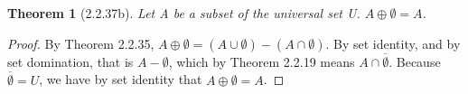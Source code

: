 \documentclass[a4paper, 12pt]{article}
\theoremstyle{plain}
\newtheorem*{theorem*}{Theorem}
\begin{document}
	
	\begin{theorem*}[2.2.37b]
		Let A be a subset of the universal set U. $A \oplus \emptyset = A$.
	\end{theorem*}
	
	\begin{proof}
		By Theorem 2.2.35, $A \oplus \emptyset = (A \cup \emptyset) - (A \cap \emptyset)$. By set identity, and by set domination, that is $A - \emptyset$, which by Theorem 2.2.19 means $A \cap \overline{\emptyset}$. Because $\overline{\emptyset} = U$, we have by set identity that $A \oplus \emptyset = A$.
	\end{proof}
\end{document}
